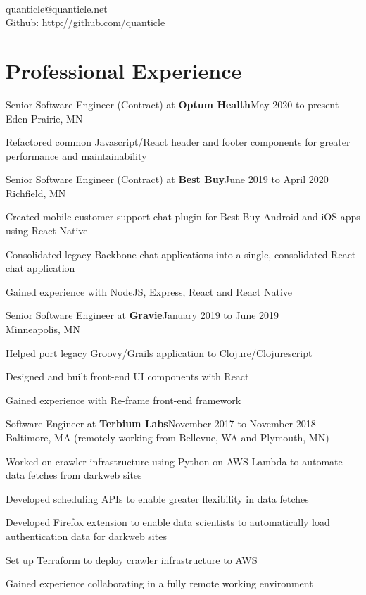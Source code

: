 \documentclass[letterpaper]{article}
\newenvironment{resume-list}
{\begin{itemize}
 \setlength{\itemsep}{0pt}
 \setlength{\parskip}{0pt}}
{\end{itemize}}
\begin{document}
\\
{\small quanticle@quanticle.net}\\
{\small Github: \url{http://github.com/quanticle}}\\
\section*{Professional Experience}
\noindent Senior Software Engineer (Contract) at {\bfseries Optum Health}\dotfill May 2020 to present\\
Eden Prairie, MN
\begin{resume-list}
\item Refactored common Javascript/React header and footer components for greater performance and maintainability
\end{resume-list}
\noindent Senior Software Engineer (Contract) at {\bfseries Best Buy}\dotfill June 2019 to April 2020\\
Richfield, MN
\begin{resume-list}
\item Created mobile customer support chat plugin for Best Buy Android and iOS apps using React Native
\item Consolidated legacy Backbone chat applications into a single, consolidated React chat application
\item Gained experience with NodeJS, Express, React and React Native
\end{resume-list}
\noindent Senior Software Engineer at {\bfseries Gravie}\dotfill January 2019 to June 2019\\
Minneapolis, MN
\begin{resume-list}
\item Helped port legacy Groovy/Grails application to Clojure/Clojurescript
\item Designed and built front-end UI components with React
\item Gained experience with Re-frame front-end framework
\end{resume-list}
\noindent Software Engineer at {\bfseries Terbium Labs}\dotfill November 2017 to November 2018\\
Baltimore, MA (remotely working from Bellevue, WA and Plymouth, MN)
\begin{resume-list}
\item Worked on crawler infrastructure using Python on AWS Lambda to automate data fetches from darkweb sites
\item Developed scheduling APIs to enable greater flexibility in data fetches
\item Developed Firefox extension to enable data scientists to automatically load authentication data for darkweb sites
\item Set up Terraform to deploy crawler infrastructure to AWS
\item Gained experience collaborating in a fully remote working environment
\end{resume-list}
\end{document}
